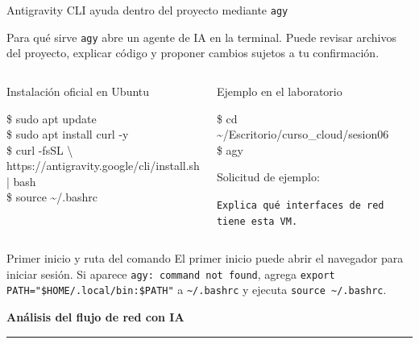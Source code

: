 \documentclass[aspectratio=169,10pt,c]{beamer}
\begin{document}
\begin{frame}{Antigravity CLI ayuda dentro del proyecto mediante \texttt{agy}}
\begin{block}{Para qué sirve}
\small \texttt{agy} abre un agente de IA en la terminal. Puede revisar archivos del proyecto, explicar código y proponer cambios sujetos a tu confirmación.
\end{block}
\begin{columns}[T,onlytextwidth]
\begin{exampleblock}{Instalación oficial en Ubuntu}
\begin{terminal}\footnotesize
\$ sudo apt update\\
\$ sudo apt install curl -y\\
\$ curl -fsSL \textbackslash\\
\quad https://antigravity.google/cli/install.sh | bash\\
\$ source \textasciitilde/.bashrc
\end{terminal}
\end{exampleblock}
\begin{exampleblock}{Ejemplo en el laboratorio}
\begin{terminal}\footnotesize
\$ cd \textasciitilde/Escritorio/curso\_cloud/sesion06\\
\$ agy
\end{terminal}
\small Solicitud de ejemplo:\par
\texttt{Explica qué interfaces de red tiene esta VM.}
\end{exampleblock}
\end{columns}
\begin{alertblock}{Primer inicio y ruta del comando}
\scriptsize El primer inicio puede abrir el navegador para iniciar sesión. Si aparece \texttt{agy: command not found}, agrega \texttt{export PATH="\$HOME/.local/bin:\$PATH"} a \texttt{\textasciitilde/.bashrc} y ejecuta \texttt{source \textasciitilde/.bashrc}.
\end{alertblock}
\end{frame}

\begin{frame}[plain]
\vfill
\begin{center}
{\fontsize{29}{34}\selectfont\bfseries Análisis del flujo de red con IA}\par
\vspace{4mm}
{\color{utpRojo}\rule{8.5cm}{1.2pt}}
\end{center}
\vfill
\end{frame}
\end{document}
